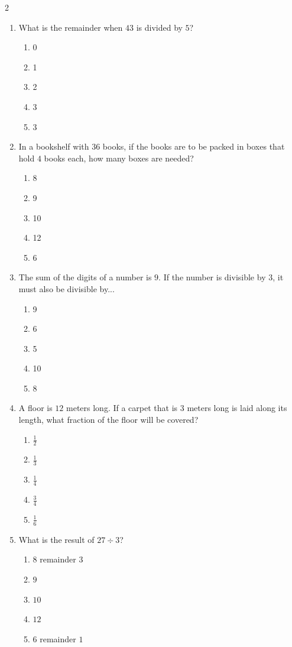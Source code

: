 \documentclass[10pt]{article}
\begin{document}
\begin{multicols}{2}
\begin{enumerate}[label=\textbf{Q\arabic*.}, leftmargin=*, itemsep=6pt, parsep=0pt]
  \item \small What is the remainder when $43$ is divided by $5$?
  \begin{enumerate}[label=(\Alph*), leftmargin=0.6cm, nosep, itemsep=2pt]
    \item 0
    \item 1
    \item 2
    \item 3
    \item 3
  \end{enumerate}

  \item \small In a bookshelf with $36$ books, if the books are to be packed in boxes that hold $4$ books each, how many boxes are needed?
  \begin{enumerate}[label=(\Alph*), leftmargin=0.6cm, nosep, itemsep=2pt]
    \item 8
    \item 9
    \item 10
    \item 12
    \item 6
  \end{enumerate}

  \item \small The sum of the digits of a number is $9$. If the number is divisible by $3$, it must also be divisible by...
  \begin{enumerate}[label=(\Alph*), leftmargin=0.6cm, nosep, itemsep=2pt]
    \item 9
    \item 6
    \item 5
    \item 10
    \item 8
  \end{enumerate}

  \item \small A floor is $12$ meters long. If a carpet that is $3$ meters long is laid along its length, what fraction of the floor will be covered?
  \begin{enumerate}[label=(\Alph*), leftmargin=0.6cm, nosep, itemsep=2pt]
    \item $\frac{1}{2}$
    \item $\frac{1}{3}$
    \item $\frac{1}{4}$
    \item $\frac{3}{4}$
    \item $\frac{1}{6}$
  \end{enumerate}

  \item \small What is the result of $27 \div 3$?
  \begin{enumerate}[label=(\Alph*), leftmargin=0.6cm, nosep, itemsep=2pt]
    \item $8$ remainder $3$
    \item $9$
    \item $10$
    \item $12$
    \item $6$ remainder $1$
  \end{enumerate}


\end{enumerate}
\end{multicols}
\end{document}
